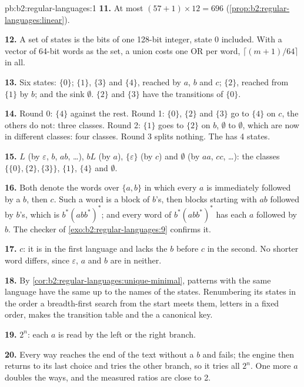 \begin{solution}{pb:b2:regular-languages:1}
\textbf{11.} At most $(57 + 1) \times 12 = 696$ (\cref{prop:b2:regular-languages:linear}).

\textbf{12.} A set of states is the bits of one 128-bit integer, state 0 included. With a vector of 64-bit words as the
set, a union costs one OR per word, $\lceil (m + 1)/64 \rceil$ in all.

\textbf{13.} Six states: $\{0\}$; $\{1\}$, $\{3\}$ and $\{4\}$, reached by $a$, $b$ and $c$; $\{2\}$, reached from
$\{1\}$ by $b$; and the sink $\emptyset$. $\{2\}$ and $\{3\}$ have the transitions of $\{0\}$.

\textbf{14.} Round 0: $\{4\}$ against the rest. Round 1: $\{0\}$, $\{2\}$ and $\{3\}$ go to $\{4\}$ on $c$, the others
do not: three classes. Round 2: $\{1\}$ goes to $\{2\}$ on $b$, $\emptyset$ to $\emptyset$, which are now in different
classes: four classes. Round 3 splits nothing. The  has 4 states.

\textbf{15.} $L$ (by $\varepsilon$, $b$, $ab$, \dots), $bL$ (by $a$), $\{\varepsilon\}$ (by $c$) and $\emptyset$ (by
$aa$, $cc$, \dots): the classes $\{\{0\}, \{2\}, \{3\}\}$, $\{1\}$, $\{4\}$ and $\emptyset$.

\textbf{16.} Both denote the words over $\{a, b\}$ in which every $a$ is immediately followed by a $b$, then $c$. Such
a word is a block of $b$'s, then blocks starting with $ab$ followed by $b$'s, which is $b^*(abb^*)^*$; and every word of
$b^*(abb^*)^*$ has each $a$ followed by $b$. The checker of \cref{exo:b2:regular-languages:9} confirms it.

\textbf{17.} $c$: it is in the first language and lacks the $b$ before $c$ in the second. No shorter word differs,
since $\varepsilon$, $a$ and $b$ are in neither.

\textbf{18.} By \cref{cor:b2:regular-languages:unique-minimal}, patterns with the same language have the same  up to the names of the states. Renumbering its states in the order a breadth-first search from the start
meets them, letters in a fixed order, makes the transition table and the  a canonical key.

\textbf{19.} $2^n$: each $a$ is read by the left or the right branch.

\textbf{20.} Every way reaches the end of the text without a $b$ and fails; the engine then returns to its last choice
and tries the other branch, so it tries all $2^n$. One more $a$ doubles the ways, and the measured ratios are close
to 2.


\end{solution}
